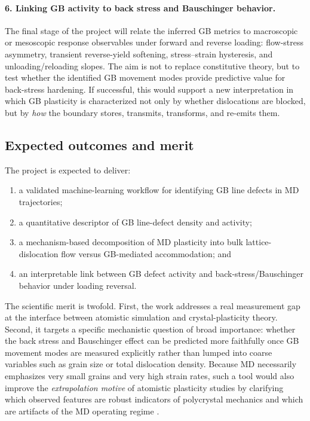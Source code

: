 \documentclass[11pt]{article}
\begin{document}
\paragraph{6. Linking GB activity to back stress and Bauschinger behavior.}
The final stage of the project will relate the inferred GB metrics to macroscopic or mesoscopic response observables under forward and reverse loading: flow-stress asymmetry, transient reverse-yield softening, stress--strain hysteresis, and unloading/reloading slopes. The aim is not to replace constitutive theory, but to test whether the identified GB movement modes provide predictive value for back-stress hardening. If successful, this would support a new interpretation in which GB plasticity is characterized not only by whether dislocations are blocked, but by \emph{how} the boundary stores, transmits, transforms, and re-emits them.

\subsection*{Expected outcomes and merit}
The project is expected to deliver:
\begin{enumerate}
    \item a validated machine-learning workflow for identifying GB line defects in MD trajectories;
    \item a quantitative descriptor of GB line-defect density and activity;
    \item a mechanism-based decomposition of MD plasticity into bulk lattice-dislocation flow versus GB-mediated accommodation; and
    \item an interpretable link between GB defect activity and back-stress/Bauschinger behavior under loading reversal.
\end{enumerate}

The scientific merit is twofold. First, the work addresses a real measurement gap at the interface between atomistic simulation and crystal-plasticity theory. Second, it targets a specific mechanistic question of broad importance: whether the back stress and Bauschinger effect can be predicted more faithfully once GB movement modes are measured explicitly rather than lumped into coarse variables such as grain size or total dislocation density. Because MD necessarily emphasizes very small grains and very high strain rates, such a tool would also improve the \emph{extrapolation motive} of atomistic plasticity studies by clarifying which observed features are robust indicators of polycrystal mechanics and which are artifacts of the MD operating regime \cite{Materials2020,Huang2019}.
\end{document}
